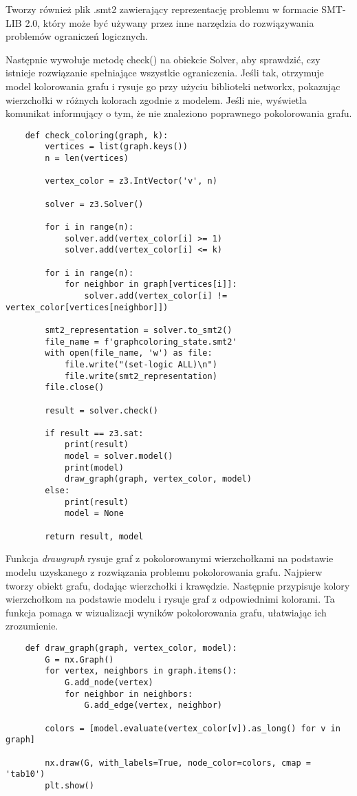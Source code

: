 Tworzy również plik .smt2 zawierający reprezentację problemu w formacie SMT-LIB 2.0, który może być używany przez inne narzędzia do rozwiązywania problemów ograniczeń logicznych.

Następnie wywołuje metodę check() na obiekcie Solver, aby sprawdzić, czy istnieje rozwiązanie spełniające wszystkie ograniczenia. Jeśli tak, otrzymuje model kolorowania grafu i rysuje go przy użyciu biblioteki networkx, pokazując wierzchołki w różnych kolorach zgodnie z modelem. Jeśli nie, wyświetla komunikat informujący o tym, że nie znaleziono poprawnego pokolorowania grafu.

\begin{lstlisting}
	def check_coloring(graph, k):
		vertices = list(graph.keys())
		n = len(vertices)
		
		vertex_color = z3.IntVector('v', n)
		
		solver = z3.Solver()
		
		for i in range(n):
			solver.add(vertex_color[i] >= 1)
			solver.add(vertex_color[i] <= k)
		
		for i in range(n):
			for neighbor in graph[vertices[i]]:
				solver.add(vertex_color[i] != vertex_color[vertices[neighbor]])
		
		smt2_representation = solver.to_smt2()
		file_name = f'graphcoloring_state.smt2'
		with open(file_name, 'w') as file:
			file.write("(set-logic ALL)\n")
			file.write(smt2_representation)  
		file.close()
		
		result = solver.check()
		
		if result == z3.sat:
			print(result)
			model = solver.model()
			print(model)
			draw_graph(graph, vertex_color, model)
		else:
			print(result)
			model = None
		
		return result, model
\end{lstlisting}

Funkcja \textit{draw\textunderscore graph} rysuje graf z pokolorowanymi wierzchołkami na podstawie modelu uzyskanego z rozwiązania problemu pokolorowania grafu. Najpierw tworzy obiekt grafu, dodając wierzchołki i krawędzie. Następnie przypisuje kolory wierzchołkom na podstawie modelu i rysuje graf z odpowiednimi kolorami. Ta funkcja pomaga w wizualizacji wyników pokolorowania grafu, ułatwiając ich zrozumienie.

\begin{lstlisting}
	def draw_graph(graph, vertex_color, model):
		G = nx.Graph()
		for vertex, neighbors in graph.items():
			G.add_node(vertex)
			for neighbor in neighbors:
				G.add_edge(vertex, neighbor)
		
		colors = [model.evaluate(vertex_color[v]).as_long() for v in graph]
		
		nx.draw(G, with_labels=True, node_color=colors, cmap = 'tab10')
		plt.show()
\end{lstlisting}


